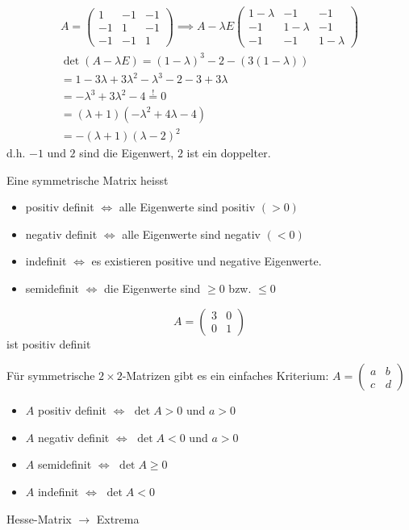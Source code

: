\begin{Bsp}
  \begin{eqnarray*}
  A=
  \begin{pmatrix}
    1&-1&-1\\
    -1&1&-1\\
    -1&-1&1
  \end{pmatrix}
  \implies A-\lambda E
  \begin{pmatrix}
    1-\lambda&-1&-1\\
    -1&1-\lambda&-1\\
    -1&-1&1-\lambda
  \end{pmatrix}
  \\
  \det(A-\lambda E)=(1-\lambda)^3-2-(3(1-\lambda))\\
  =1-3\lambda+3\lambda^2-\lambda^3-2-3+3\lambda\\
  =-\lambda^3+3\lambda^2-4\stackrel{!}{=}0\\
  =(\lambda+1)(-\lambda^2+4\lambda-4)\\
  =-(\lambda+1)(\lambda-2)^2
  \end{eqnarray*}
  d.h. $-1$ und $2$ sind die Eigenwert, $2$ ist ein doppelter.
\end{Bsp}
\begin{Def}
  Eine symmetrische Matrix heisst
  \begin{itemize}
    \item positiv definit $\iff$ alle Eigenwerte sind positiv $(>0)$
    \item negativ definit $\iff$ alle Eigenwerte sind negativ $(<0)$
    \item indefinit $\iff$ es existieren positive und negative Eigenwerte.
    \item semidefinit $\iff$ die Eigenwerte sind $\geq 0$ bzw. $\leq 0$
  \end{itemize}
\end{Def}
\begin{Bsp}
  \[A= \begin{pmatrix}
    3&0\\0&1
  \end{pmatrix}\]
  ist positiv definit
\end{Bsp}
\begin{Bem}
  Für symmetrische $2\times 2$-Matrizen gibt es ein einfaches Kriterium: $A= \begin{pmatrix} a&b\\c&d \end{pmatrix}$
  \begin{itemize}
    \item $A$ positiv definit $\iff$ $\det A>0$ und $a>0$
    \item $A$ negativ definit $\iff$ $\det A<0$ und $a>0$
    \item $A$ semidefinit $\iff$ $\det A\geq0$
    \item $A$ indefinit $\iff$ $\det A<0$
  \end{itemize}
\end{Bem}
\begin{Bsp}
  Hesse-Matrix $\to$ Extrema
\end{Bsp}
